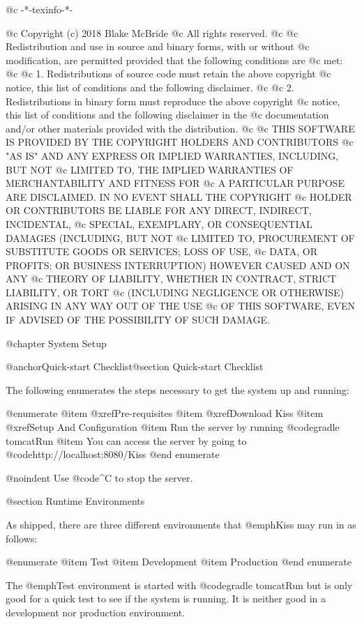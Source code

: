 @c -*-texinfo-*-

@c  Copyright (c) 2018 Blake McBride
@c  All rights reserved.
@c
@c  Redistribution and use in source and binary forms, with or without
@c  modification, are permitted provided that the following conditions are
@c  met:
@c
@c  1. Redistributions of source code must retain the above copyright
@c  notice, this list of conditions and the following disclaimer.
@c
@c  2. Redistributions in binary form must reproduce the above copyright
@c  notice, this list of conditions and the following disclaimer in the
@c  documentation and/or other materials provided with the distribution.
@c
@c  THIS SOFTWARE IS PROVIDED BY THE COPYRIGHT HOLDERS AND CONTRIBUTORS
@c  "AS IS" AND ANY EXPRESS OR IMPLIED WARRANTIES, INCLUDING, BUT NOT
@c  LIMITED TO, THE IMPLIED WARRANTIES OF MERCHANTABILITY AND FITNESS FOR
@c  A PARTICULAR PURPOSE ARE DISCLAIMED. IN NO EVENT SHALL THE COPYRIGHT
@c  HOLDER OR CONTRIBUTORS BE LIABLE FOR ANY DIRECT, INDIRECT, INCIDENTAL,
@c  SPECIAL, EXEMPLARY, OR CONSEQUENTIAL DAMAGES (INCLUDING, BUT NOT
@c  LIMITED TO, PROCUREMENT OF SUBSTITUTE GOODS OR SERVICES; LOSS OF USE,
@c  DATA, OR PROFITS; OR BUSINESS INTERRUPTION) HOWEVER CAUSED AND ON ANY
@c  THEORY OF LIABILITY, WHETHER IN CONTRACT, STRICT LIABILITY, OR TORT
@c  (INCLUDING NEGLIGENCE OR OTHERWISE) ARISING IN ANY WAY OUT OF THE USE
@c  OF THIS SOFTWARE, EVEN IF ADVISED OF THE POSSIBILITY OF SUCH DAMAGE.


@chapter System Setup


@anchor{Quick-start Checklist}@section Quick-start Checklist

The following enumerates the steps necessary to get the system up and running:

@enumerate
@item
@xref{Pre-requisites}
@item
@xref{Download Kiss}
@item
@xref{Setup And Configuration}
@item
Run the server by running @code{gradle tomcatRun}
@item
You can access the server by going to @code{http://localhost:8080/Kiss}
@end enumerate

@noindent Use @code{^C} to stop the server.

@section Runtime Environments

As shipped, there are three different environments that @emph{Kiss} may
run in as follows:

@enumerate
@item
Test
@item
Development
@item 
Production
@end enumerate

The @emph{Test} environment is started with @code{gradle tomcatRun} but
is only good for a quick test to see if the system is running.  It is
neither good in a development nor production environment.

